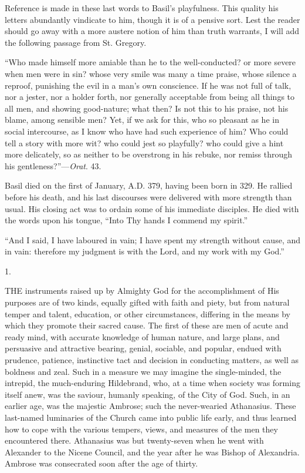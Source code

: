 Reference is made in these last words to Basil's playfulness. This
quality his letters abundantly vindicate to him, though it is of a
pensive sort. Lest the reader should go away with a more austere
notion of him than truth warrants, I will add the following passage
from St. Gregory.

``Who made himself more amiable than he to the well-conducted?
or more severe when men were in sin? whose very smile was many a time
praise, whose silence a reproof, punishing the evil in a man's own
conscience. If he was not full of talk, nor a jester, nor a holder
forth, nor generally acceptable from being all things to all men, and
showing good-nature; what then? Is not this to his praise, not his
blame, among sensible men? Yet, if we ask for this, who so pleasant as
he in social intercourse, as I know who have had such experience of
him? Who could tell a story with more wit? who could jest so
playfully? who could give a hint more delicately, so as neither to be
overstrong in his rebuke, nor remiss through his gentleness?''—\emph{Orat}.
43.

Basil died on the first of January, A.D. 379,
having been born in 329. He rallied before his death, and his
last discourses were delivered with more strength than usual. His
closing act was to ordain some of his immediate disciples. He died
with the words upon his tongue, ``Into Thy hands I commend my
spirit.''


``And I said, I have laboured in vain; I have spent my
strength without cause, and in vain: therefore my judgment is with the
Lord, and my work with my God.''

1.

THE instruments raised up by Almighty God for
the accomplishment of His purposes are of two kinds, equally gifted
with faith and piety, but from natural temper and talent, education,
or other circumstances, differing in the means by which they promote
their sacred cause. The first of these are men of acute and ready
mind, with accurate knowledge of human nature, and large plans, and
persuasive and attractive bearing, genial, sociable, and popular,
endued with prudence, patience, instinctive tact and decision in
conducting matters, as well as boldness and zeal. Such in a measure we
may imagine the single-minded, the intrepid, the much-enduring
Hildebrand, who, at a time when society was forming itself anew, was
the saviour, humanly speaking, of the City of God. Such, in an earlier
age, was the majestic Ambrose; such the never-wearied Athanasius.
These last-named luminaries of the Church came into public life early,
and thus learned how to cope with the various tempers, views, and
measures of the men they encountered there. Athanasius was but
twenty-seven when he went with Alexander to the Nicene Council,
and the year after he was Bishop of Alexandria. Ambrose was
consecrated soon after the age of thirty.

